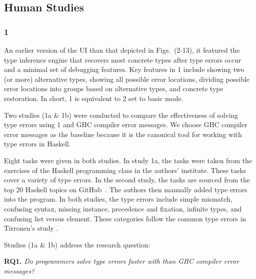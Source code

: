 \subsection{\chameleon{} Human Studies}

\subsubsection{\textbf{\chameleon{} 1}}  
An earlier version of the UI than that depicted in Figs.~(2-13), it featured the type inference engine that recovers most concrete types after type errors occur and a minimal set of debugging features. Key features in \chameleon{} 1 include showing two (or more) alternative types, showing all possible error locations, dividing possible error locations into groups based on alternative types, and concrete type restoration. In short, \chameleon{} 1 is equivalent to \chameleon{} 2 set to basic mode. 


Two  studies (1a \& 1b) were conducted to compare the effectiveness of solving type errors using \chameleon{} 1 and GHC compiler error messages. We choose GHC compiler error messages as the baseline because it is the canonical tool for working with type errors in Haskell.


Eight tasks were given in both studies. In study 1a, the tasks were taken from the exercises of the Haskell programming class in the authors' institute. These tasks cover a variety of type errors.  In the second study, the tasks are sourced from the top 20 Haskell topics on GitHub~\cite{github_github_2022}. The authors then manually added type errors into the program. In both studies, the type errors include simple mismatch, confusing syntax, missing instance, precedence and fixation, infinite types, and confusing list versus element. These categories follow the common type errors in Tirronen's study \cite{tirronen_understanding_2015}. 

Studies (1a \& 1b) address the research question:

\noindent\textbf{RQ1.} \textit{Do programmers solve type errors faster with \chameleon{} than GHC compiler error messages?}



